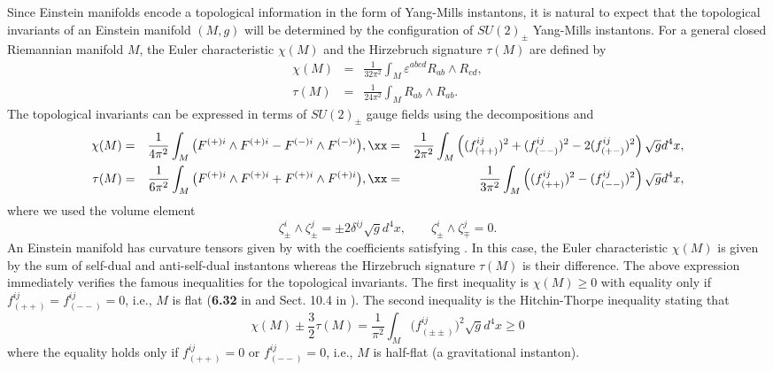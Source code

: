 \documentclass[12pt,epsf]{article}
\begin{document}
Since Einstein manifolds encode a topological information in the form of Yang-Mills instantons,
it is natural to expect that the topological invariants of an Einstein manifold $(M,g)$ will be determined
by the configuration of $SU(2)_\pm$ Yang-Mills instantons.
For a general closed Riemannian manifold $M$, the Euler characteristic $\chi(M)$ and
the Hirzebruch signature $\tau(M)$ are defined by \cite{book-besse,egh-report}
\begin{eqnarray} \label{top-euler}
\chi(M) &=& \frac{1}{32 \pi^2} \int_M \varepsilon^{abcd} R_{ab} \wedge R_{cd}, \\
\label{top-hirze}
\tau(M) &=& \frac{1}{24 \pi^2} \int_M  R_{ab} \wedge R_{ab}.
\end{eqnarray}
The topological invariants can be expressed in terms of $SU(2)_\pm$ gauge fields
using the decompositions  and 
\begin{eqnarray} \label{dec-euler}
\chi(M) &=& \frac{1}{4 \pi^2} \int_M \big( F^{(+)i} \wedge F^{(+)i} - F^{(-)i} \wedge F^{(-)i} \big), \xx
&=& \frac{1}{2 \pi^2} \int_M \left( (f^{ij}_{(++)})^2 + (f^{ij}_{(--)})^2 - 2 (f^{ij}_{(+-)})^2 \right) \sqrt{g} d^4 x, \\
\label{dec-hirze}
\tau(M) &=& \frac{1}{6 \pi^2} \int_M \big( F^{(+)i} \wedge F^{(+)i} + F^{(+)i} \wedge F^{(+)i} \big), \xx
&=& \frac{1}{3 \pi^2} \int_M \left( (f^{ij}_{(++)})^2 - (f^{ij}_{(--)})^2 \right) \sqrt{g} d^4 x,
\end{eqnarray}
where we used the volume element
\begin{equation*}
  \zeta_\pm^i \wedge \zeta_\pm^j = \pm 2 \delta^{ij} \sqrt{g} d^4 x, \qquad
  \zeta_\pm^i \wedge \zeta_\mp^j = 0.
\end{equation*}
An Einstein manifold has curvature tensors given by  with the coefficients satisfying .
In this case, the Euler characteristic $\chi(M)$ is given by the sum of self-dual and anti-self-dual instantons
whereas the Hirzebruch signature $\tau(M)$ is their difference. The above expression immediately verifies
the famous inequalities for the topological invariants. The first inequality is $\chi(M)\geq 0$ with equality
only if $f^{ij}_{(++)} = f^{ij}_{(--)} = 0$, i.e., $M$ is flat (\textbf{6.32} in \cite{book-besse} and Sect. 10.4 in \cite{egh-report}).
The second inequality is the Hitchin-Thorpe inequality \cite{hitchin1974} stating that
\begin{equation}\label{hitchin-thorpe}
  \chi (M) \pm \frac{3}{2} \tau (M) = \frac{1}{\pi^2} \int_M  \big(f^{ij}_{(\pm\pm)} \big)^2  \sqrt{g} d^4 x \geq 0
\end{equation}
where the equality holds only if $f^{ij}_{(++)} = 0$ or $f^{ij}_{(--)} = 0$, i.e., $M$ is half-flat
(a gravitational instanton).
\end{document}
